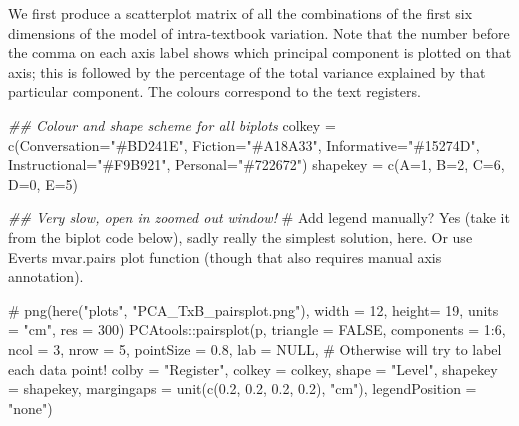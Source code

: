 \documentclass[
  letterpaper,
  DIV=11,
  numbers=noendperiod]{scrreprt}
\newenvironment{Shaded}{\begin{snugshade}}{\end{snugshade}}
\newcommand{\AttributeTok}[1]{\textcolor[rgb]{0.40,0.45,0.13}{#1}}
\newcommand{\CommentTok}[1]{\textcolor[rgb]{0.37,0.37,0.37}{#1}}
\newcommand{\ConstantTok}[1]{\textcolor[rgb]{0.56,0.35,0.01}{#1}}
\newcommand{\DecValTok}[1]{\textcolor[rgb]{0.68,0.00,0.00}{#1}}
\newcommand{\DocumentationTok}[1]{\textcolor[rgb]{0.37,0.37,0.37}{\textit{#1}}}
\newcommand{\FloatTok}[1]{\textcolor[rgb]{0.68,0.00,0.00}{#1}}
\newcommand{\FunctionTok}[1]{\textcolor[rgb]{0.28,0.35,0.67}{#1}}
\newcommand{\NormalTok}[1]{\textcolor[rgb]{0.00,0.23,0.31}{#1}}
\newcommand{\OtherTok}[1]{\textcolor[rgb]{0.00,0.23,0.31}{#1}}
\newcommand{\SpecialCharTok}[1]{\textcolor[rgb]{0.37,0.37,0.37}{#1}}
\newcommand{\StringTok}[1]{\textcolor[rgb]{0.13,0.47,0.30}{#1}}
\begin{document}
We first produce a scatterplot matrix of all the combinations of the
first six dimensions of the model of intra-textbook variation. Note that
the number before the comma on each axis label shows which principal
component is plotted on that axis; this is followed by the percentage of
the total variance explained by that particular component. The colours
correspond to the text registers.

\begin{Shaded}
\begin{Highlighting}[]
\DocumentationTok{\#\# Colour and shape scheme for all biplots}
\NormalTok{colkey }\OtherTok{=} \FunctionTok{c}\NormalTok{(}\AttributeTok{Conversation=}\StringTok{"\#BD241E"}\NormalTok{, }\AttributeTok{Fiction=}\StringTok{"\#A18A33"}\NormalTok{, }\AttributeTok{Informative=}\StringTok{"\#15274D"}\NormalTok{, }\AttributeTok{Instructional=}\StringTok{"\#F9B921"}\NormalTok{, }\AttributeTok{Personal=}\StringTok{"\#722672"}\NormalTok{)}
\NormalTok{shapekey }\OtherTok{=} \FunctionTok{c}\NormalTok{(}\AttributeTok{A=}\DecValTok{1}\NormalTok{, }\AttributeTok{B=}\DecValTok{2}\NormalTok{, }\AttributeTok{C=}\DecValTok{6}\NormalTok{, }\AttributeTok{D=}\DecValTok{0}\NormalTok{, }\AttributeTok{E=}\DecValTok{5}\NormalTok{)}

\DocumentationTok{\#\# Very slow, open in zoomed out window!}
\CommentTok{\# Add legend manually? Yes (take it from the biplot code below), sadly really the simplest solution, here. Or use Evert\textquotesingle{}s mvar.pairs plot function (though that also requires manual axis annotation).}

\CommentTok{\# png(here("plots", "PCA\_TxB\_pairsplot.png"), width = 12, height= 19, units = "cm", res = 300)}
\NormalTok{PCAtools}\SpecialCharTok{::}\FunctionTok{pairsplot}\NormalTok{(p,}
                 \AttributeTok{triangle =} \ConstantTok{FALSE}\NormalTok{,}
                 \AttributeTok{components =} \DecValTok{1}\SpecialCharTok{:}\DecValTok{6}\NormalTok{,}
                 \AttributeTok{ncol =} \DecValTok{3}\NormalTok{,}
                 \AttributeTok{nrow =} \DecValTok{5}\NormalTok{,}
                 \AttributeTok{pointSize =} \FloatTok{0.8}\NormalTok{,}
                 \AttributeTok{lab =} \ConstantTok{NULL}\NormalTok{, }\CommentTok{\# Otherwise will try to label each data point!}
                 \AttributeTok{colby =} \StringTok{"Register"}\NormalTok{,}
                 \AttributeTok{colkey =}\NormalTok{ colkey,}
                 \AttributeTok{shape =} \StringTok{"Level"}\NormalTok{,}
                 \AttributeTok{shapekey =}\NormalTok{ shapekey,}
                 \AttributeTok{margingaps =} \FunctionTok{unit}\NormalTok{(}\FunctionTok{c}\NormalTok{(}\FloatTok{0.2}\NormalTok{, }\FloatTok{0.2}\NormalTok{, }\FloatTok{0.2}\NormalTok{, }\FloatTok{0.2}\NormalTok{), }\StringTok{"cm"}\NormalTok{),}
                 \AttributeTok{legendPosition =} \StringTok{"none"}\NormalTok{)}
\end{Highlighting}
\end{Shaded}
\end{document}
